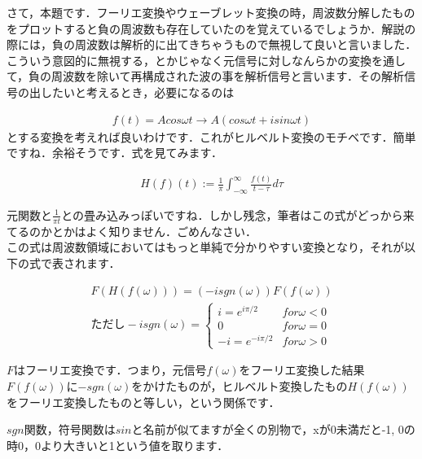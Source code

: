 \documentclass[11pt,a4paper]{ujreport} 	%
\begin{document}
さて，本題です．フーリエ変換やウェーブレット変換の時，周波数分解したものをプロットすると負の周波数も存在していたのを覚えているでしょうか．解説の際には，負の周波数は解析的に出てきちゃうもので無視して良いと言いました．こういう意図的に無視する，とかじゃなく元信号に対しなんらかの変換を通して，負の周波数を除いて再構成された波の事を解析信号と言います．その解析信号の出したいと考えるとき，必要になるのは


\begin{eqnarray}
  f(t) = Acos\omega t\rightarrow A(cos\omega t + i sin\omega t)
\end{eqnarray}
とする変換を考えれば良いわけです．これがヒルベルト変換のモチベです．簡単ですね．余裕そうです．式を見てみます．


\begin{eqnarray}
  \label{eq:hilbert1}
  H(f)(t):= \frac{1}{\pi} \int_{-\infty}^\infty \frac{f(t)}{t-\tau} d\tau
\end{eqnarray}

元関数と$\frac{1}{\pi t}$との畳み込みっぽいですね．しかし残念，筆者はこの式がどっから来てるのかとかはよく知りません．ごめんなさい．\\

この式は周波数領域においてはもっと単純で分かりやすい変換となり，それが以下の式で表されます．


\begin{eqnarray}
  \label{eq:hilbert2}
  F(H(f(\omega))) = (-i sgn(\omega))F(f(\omega))\\
  \text{ただし} -i sgn(\omega) =
  \begin{cases}
    i=e^{i\pi/2} & for \omega<0\\
    0 & for \omega = 0\\
    -i = e^{-i\pi/2} & for \omega > 0
  \end{cases}
\end{eqnarray}


$F$はフーリエ変換です．つまり，元信号$f(\omega)$をフーリエ変換した結果$F(f(\omega))$に$-sgn(\omega)$をかけたものが，ヒルベルト変換したもの$H(f(\omega))$をフーリエ変換したものと等しい，という関係です．

$sgn$関数，符号関数は$sin$と名前が似てますが全くの別物で，xが0未満だと-1, 0の時0，0より大きいと1という値を取ります．
\end{document}
